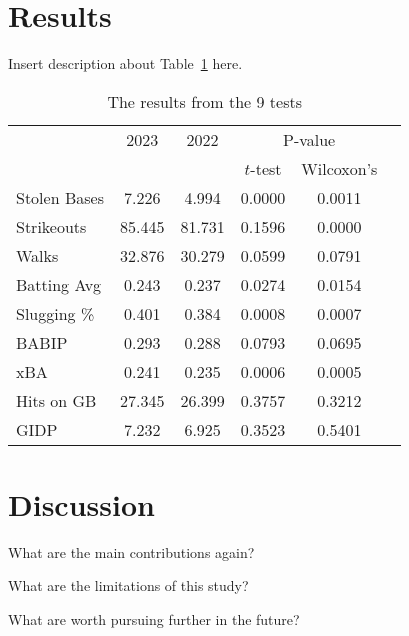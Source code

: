 \documentclass[12pt]{article}
\begin{document}
\section{Results}
\label{sec:resu}

Insert description about Table~\ref{tab:table1} here.

\begin{table}[tbp]
  \caption{The results from the 9 tests}
  \label{tab:table1}
  \centering
  \begin{tabular}[t]{lccccc}
    \toprule
    & 2023 & 2022 & \multicolumn{2}{c}{P-value}\\
    \cmidrule(lr){4-5}
    &          &                & \(t\)-test & Wilcoxon's\\
    \midrule
    Stolen Bases & 7.226 & 4.994 & 0.0000 & 0.0011 \\ 
    Strikeouts & 85.445 & 81.731 & 0.1596 & 0.0000 \\ 
    Walks & 32.876 & 30.279 & 0.0599 & 0.0791 \\ 
    Batting Avg & 0.243 & 0.237 & 0.0274 & 0.0154 \\ 
    Slugging \% & 0.401 & 0.384 & 0.0008 & 0.0007 \\ 
    BABIP & 0.293 & 0.288 & 0.0793 & 0.0695 \\ 
    xBA & 0.241 & 0.235 & 0.0006 & 0.0005 \\ 
    Hits on GB & 27.345 & 26.399 & 0.3757 & 0.3212 \\ 
    GIDP & 7.232 & 6.925 & 0.3523 & 0.5401 \\ 
    \bottomrule
  \end{tabular}
\end{table}


\section{Discussion}
\label{sec:disc}

What are the main contributions again?

What are the limitations of this study?

What are worth pursuing further in the future?




\end{document}
